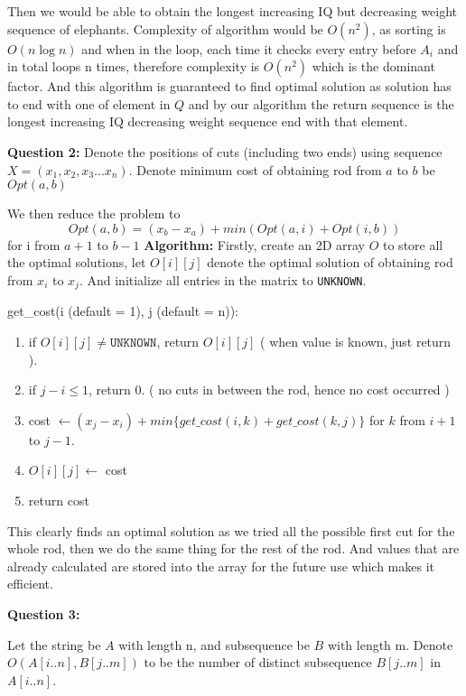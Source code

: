 \documentclass{article}
\begin{document}
Then we would be able to obtain the longest increasing IQ but decreasing weight sequence of elephants. Complexity of algorithm would be $O(n^2)$, as sorting is $O(n\log n)$ and when in the loop, each time it checks every entry before $A_i$ and in total loops n times, therefore complexity is $O(n^2)$ which is the dominant factor. And this algorithm is guaranteed to find optimal solution as solution has to end with one of element in $Q$ and by our algorithm the return sequence is the longest increasing IQ decreasing weight sequence end with that element.\pagebreak

\textbf{Question 2:\newline}
Denote the positions of cuts (including two ends) using sequence $X = (x_1, x_2, x_3 ... x_n)$. Denote minimum cost of obtaining rod from $a$ to $b$ be $Opt(a,b)$

We then reduce the problem to $$Opt(a,b) =(x_b - x_a) + min(Opt(a, i) + Opt(i, b))$$ for i from $a+1$ to $b-1$\newline
\textbf{Algorithm:}\newline
Firstly, create an 2D array $O$ to store all the optimal solutions, let $O[i][j]$ denote the optimal solution of obtaining rod from $x_i$ to $x_j$. And initialize all entries in the matrix to \texttt{UNKNOWN}.\newline

get\_cost(i (default = 1), j (default = n)):
\begin{enumerate}
\item if $O[i][j] \neq \texttt{UNKNOWN}$, return $O[i][j]$ ( when value is known, just return ).
\item if $j - i \leq 1$, return 0. ( no cuts in between the rod, hence no cost occurred )
\item cost $ \leftarrow (x_j - x_i) + min\{get\_cost(i, k) + get\_cost(k, j)\}$ for $k$ from $i+1$ to $j-1$.
\item $O[i][j] \leftarrow $ cost
\item return cost
\end{enumerate}

This clearly finds an optimal solution as we tried all the possible first cut for the whole rod, then we do the same thing for the rest of the rod. And values that are already calculated are stored into the array for the future use which makes it efficient.

\textbf{Question 3:}

Let the string be $A$ with length n, and subsequence be $B$ with length m. Denote $O(A[i .. n], B[j .. m])$ to be the number of distinct subsequence $B[j .. m]$ in $A[i .. n]$.
\end{document}

